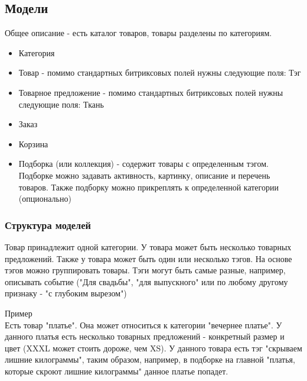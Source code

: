 \documentclass[DIV=calc, paper=a4, fontsize=11pt]{scrartcl} %
\begin{document}
\subsection{Модели}
Общее описание - есть каталог товаров, товары разделены по категориям.

\begin{itemize}
	\item Категория
	\item Товар - помимо стандартных битриксовых полей нужны следующие поля: Тэг
	\item Товарное предложение - помимо стандартных битриксовых полей нужны следующие поля: Ткань
	\item Заказ
	\item Корзина
	\item Подборка (или коллекция) - содержит товары с определенным тэгом. Подборке можно задавать активность, картинку, описание и перечень товаров. Также подборку можно прикреплять к определенной категории (опционально)
\end{itemize}

\subsubsection{Структура моделей}

Товар принадлежит одной категории. У товара может быть несколько товарных предложений. Также у товара может быть один или несколько тэгов. На основе тэгов можно группировать товары. Тэги могут быть самые разные, например, описывать событие ("Для свадьбы", "для выпускного" или по любому другому признаку - "с глубоким вырезом")
\begin{framed}
Пример
\\[0.5cm]
Есть товар "платье". Она может относиться к категории "вечернее платье". У данного платья есть несколько товарных предложений - конкретный размер и цвет (XXXL может стоить дороже, чем XS). У данного товара есть тэг "скрываем лишние килограммы", таким образом, например, в подборке на главной "платья, которые скроют лишние килограммы" данное платье попадет.
\end{framed}
\end{document}
